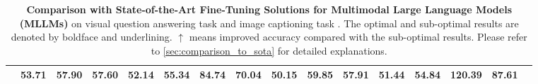 \begin{table}[t]
{{\begin{tabular}{r||cccc|cc|cIcccc|cc|c}
\ourmethod{}{}
& 53.71 & 57.90 & 57.60 & 52.14 & \textbf{55.34} & \textbf{84.74} & \quad\textbf{70.04}\quad
& 50.15 & 59.85 & 57.91 & 51.44 & \textbf{54.84} & \textbf{120.39} & \quad\textbf{87.61}\quad
\\
\hline
\end{tabular}}}
\vspace{-5pt}
\captionsetup{font=small}
\caption{{
\textbf{Comparison with State-of-the-Art Fine-Tuning Solutions for Multimodal Large Language Models (MLLMs)} on visual question answering task \iconqa{} and image captioning task \coco{}.
The optimal and sub-optimal results are denoted by boldface and underlining. {\color{RedOrange}$\uparrow$} means improved accuracy compared with the sub-optimal results. Please refer to \cref{sec:comparison_to_sota} for detailed explanations.
}}
\label{tab:compare_sota_image_capation}
\vspace{-10pt}
\end{table}
\begin{table}[t]\small
\centering
{
}
\vspace{-5pt}
\captionsetup{font=small}
\caption{
\textbf{Method Adaptation in MLLM Connector} shows significant catastrophic forgetting within the MLLM connector. Please refer to \cref{sec:cf_connector} for more details.
}
\label{tab:adapt_connector}
\vspace{-5pt}
\end{table}
